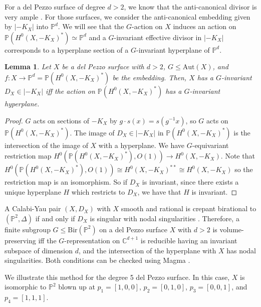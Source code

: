 \documentclass[a4paper,12pt,oneside]{amsart}
\numberwithin{equation}{section}
\newtheorem{lemma}[theorem]{Lemma}
\theoremstyle{definition}
\theoremstyle{remark}
\newcommand{\PP}{\mathbb{P}}
\newcommand{\Ptwo}{\mathbb{P}^2}
\newcommand{\Bir}{\mathrm{Bir}}
\newcommand{\Aut}{\mathrm{Aut}}
\begin{document}
For a del Pezzo surface of degree $d>2$, we know that the anti-canonical divisor is very ample \cite{Dolgachev2012}. For those surfaces, we consider the anti-canonical embedding given by \(|-K_X|\) into \(\mathbb{P}^d\). We will see that the $G$-action on $X$ induces an action on $\mathbb P(H^0(X,-K_X)^*) \simeq \mathbb P^d$ and a $G$-invariant effective divisor in  \(|-K_X|\) corresponds to a hyperplane section of a $G$-invariant hyperplane of $\PP^d$.

\begin{lemma}
Let \(X\) be a del Pezzo surface with \(d > 2\), $G\leqslant \Aut(X)$, and \(f: X \rightarrow \mathbb{P}^d = \mathbb{P}(H^0(X, -K_X)^*)\) be the embedding. Then,  \(X\) has a $G$-invariant \(D_X \in |-K_X|\) iff the action on \(\mathbb{P}(H^0(X, -K_X)^*)\) has a $G$-invariant hyperplane.
\end{lemma}

\begin{proof}
$G$ acts on sections of \(-K_X\) by \(g \cdot s(x) = s(g^{-1} x)\), so $G$ acts on \(\mathbb{P}(H^0(X, -K_X)^*)\). The image of \(D_X\in |-K_X|\) in \(\mathbb{P}(H^0(X, -K_X)^*)\) is the intersection of the image of \(X\) with a hyperplane. We have $G$-equivariant restriction map \(H^0(\mathbb{P}(H^0(X, -K_X)^*), O(1)) \rightarrow H^0(X, -K_X)\). Note that \(H^0(\mathbb{P}(H^0(X, -K_X)^*), O(1))\cong H^0(X, -K_X)^{**} \cong H^0(X, -K_X)\) so the restriction map is an isomorphism. So if $D_X$ is invariant, since there exists a unique hyperplane $H$ which restricts to $D_X$, we have that $H$ is invariant.
\end{proof}
A Calabi-Yau pair $(X,D_X)$ with $X$ smooth and rational is crepant birational to $(\Ptwo, \Delta)$ if and only if $D_X$ is singular with nodal singularities \cite[Section 1.3]{ducat2022quarticsurfacesvolumepreserving}. Therefore, a finite subgroup $G\leqslant \Bir(\Ptwo)$ on a del Pezzo surface $X$ with $d>2$ is volume-preserving iff the $G$-representation on $\mathbb C^{d+1}$ is reducible having an invariant subspace of dimension \(d\), and the intersection of the hyperplane with $X$ has nodal singularities. Both conditions can be checked using Magma \cite{magma}.
\vspace{0.3cm}

We illustrate this method for the degree 5 del Pezzo surface. In this case, \(X\) is isomorphic to \(\mathbb{P}^2\) blown up at \(p_1 = [1, 0, 0]\), \(p_2 = [0, 1, 0]\), \(p_3 = [0, 0, 1]\), and \(p_4 = [1, 1, 1]\). 
\end{document}

